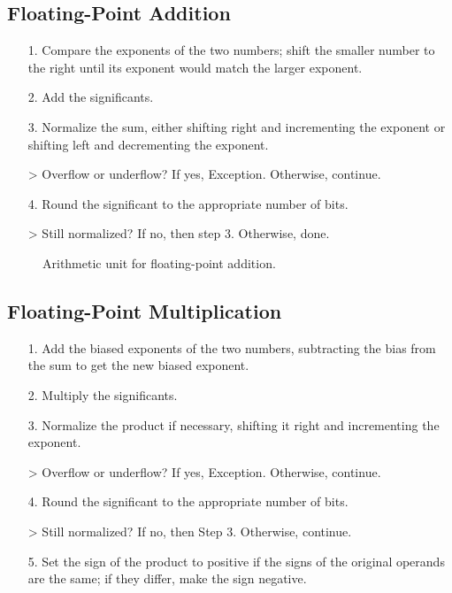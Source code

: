 \documentclass[12pt]{article}
\theoremstyle{definition}
\newcommand{\includePicture}[3]{
  \begin{figure}[!ht]
  \centering
  \scalebox{#1}{\texttt{[image: \#2]}}
  \caption{#3}
  \end{figure}
}
\begin{document}
  \subsection{Floating-Point Addition}
  \begin{itemize}
    \item[1.] Compare the exponents of the two numbers; shift the smaller number to the right until its exponent would match the larger exponent.
    \item[2.] Add the significants.
    \item[3.] Normalize the sum, either shifting right and incrementing the exponent or shifting left and decrementing the exponent.
    \item[>] Overflow or underflow? If yes, Exception. Otherwise, continue.
    \item[4.] Round the significant to the appropriate number of bits.
    \item[>] Still normalized? If no, then step 3. Otherwise, done.
  \end{itemize}
  \includePicture{0.7}{pictures/floatingAddition.png}{Arithmetic unit for floating-point addition.}

  \subsection{Floating-Point Multiplication}
  \begin{itemize}
    \item[1.] Add the biased exponents of the two numbers, subtracting the bias from the sum to get the new biased exponent.
    \item[2.] Multiply the significants.
    \item[3.] Normalize the product if necessary, shifting it right and incrementing the exponent.
    \item[>] Overflow or underflow? If yes, Exception. Otherwise, continue.
    \item[4.] Round the significant to the appropriate number of bits.
    \item[>] Still normalized? If no, then Step 3. Otherwise, continue.
    \item[5.] Set the sign of the product to positive if the signs of the original operands are the same; if they differ, make the sign negative.
  \end{itemize}

  \newpage
\end{document}
